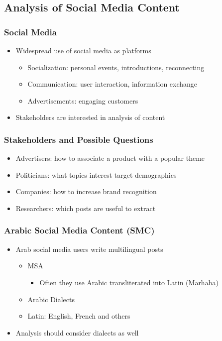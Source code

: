 \documentclass[xcolor=table]{beamer}
\newcommand{\bi}{\begin{itemize}}
\newcommand{\ei}{\end{itemize}}
\newcommand{\I}{\item}
\begin{document}
\subsection{Analysis of Social Media Content}

\begin{frame}
\frametitle{Social Media }
\begin{itemize}
\item Widespread use of social media as platforms
\begin{itemize}
\item Socialization: personal events, introductions, reconnecting
\item Communication: user interaction, information exchange
\item Advertisements: engaging customers
\end{itemize}
\item Stakeholders are interested in analysis of content
\end{itemize}

\end{frame}
\begin{frame}
  \frametitle{ Stakeholders and Possible Questions} 
  
  \bi
  \I Advertisers: how to associate a product with a popular theme
  \I Politicians: what topics interest target demographics
  \I Companies: how to increase brand recognition
  \I Researchers: which posts are useful to extract
  \ei 
\end{frame}


\begin{frame}
  \frametitle{Arabic Social Media Content (SMC)}
\begin{itemize}
\item Arab social media users write multilingual posts
\begin{itemize}
\item MSA 
  \bi  
  \I Often they use Arabic transliterated into Latin (Marhaba) 
  \ei 
\item Arabic Dialects
\item Latin: English, French and others
\end{itemize}
\item Analysis should consider dialects as well
\end{itemize}
\end{frame}
\end{document}

